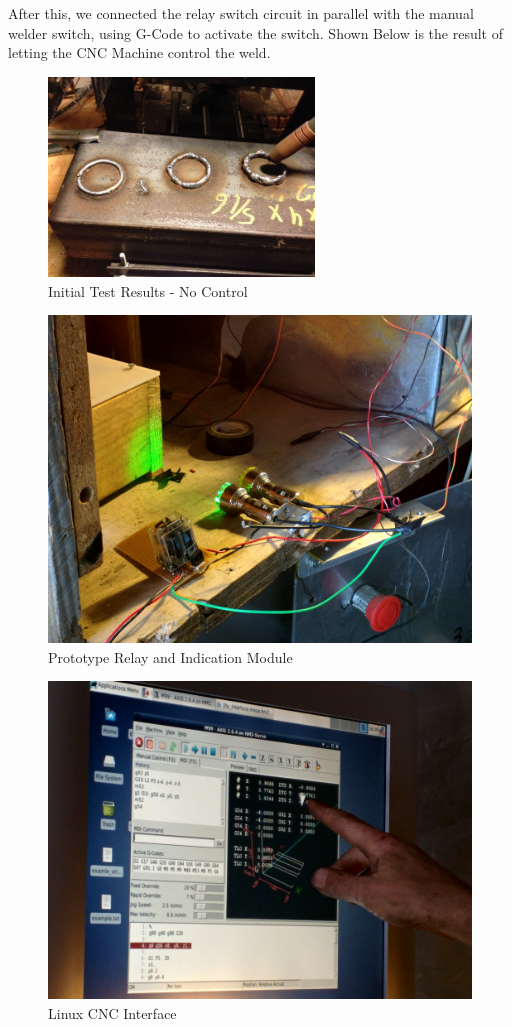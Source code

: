 \documentclass[12pt]{article}
\begin{document}
After this, we connected the relay switch circuit in parallel with the manual welder switch, using G-Code to activate the switch. Shown Below is the result of letting the CNC Machine control the weld.

\begin{figure}[!htp]
\centering
\includegraphics[width=0.63\textwidth]{pic3}
\caption{Initial Test Results - No Control}
\end{figure}



\bigskip
\begin{figure}[!ht]
\centering
\includegraphics[width=.75\textwidth]{IMG_20150410_163658}
\caption{Prototype Relay and Indication Module}
\end{figure}




\begin{figure}[!ht]
\centering
\includegraphics[width=.75\textwidth]{IMG_20150410_163626}
\caption{Linux CNC Interface}
\end{figure}
\end{document}
